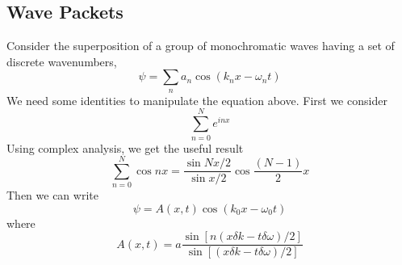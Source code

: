 \documentclass[../../../main.tex]{subfiles}
\begin{document}
\subsection*{Wave Packets}
Consider the superposition of a group of monochromatic waves having a set of discrete wavenumbers,
\begin{equation*}
    \psi=\sum_{n}a_n \cos(k_n x - \omega_n t)
\end{equation*}
We need some identities to manipulate the equation above. First we consider
\begin{equation*}
    \sum_{n=0}^{N}e^{inx}
\end{equation*} 
Using complex analysis, we get the useful result
\begin{equation*}
    \sum_{n=0}^{N}\cos nx=\frac{\sin Nx/2}{\sin x/2}\cos\frac{(N-1)}{2}x
\end{equation*}
Then we can write 
\begin{equation*}
    \psi=A(x, t)\cos(k_0 x - \omega_0 t)
\end{equation*}
where 
\begin{equation*}
    A(x, t) = a\frac{\sin[n(x\delta k  -t\delta\omega)/2]}{\sin[(x\delta k  -t\delta\omega)/2]}
\end{equation*}
\end{document}
